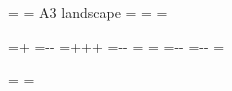 %
\ifdefined\EndleafPaper\else{}\fi
\def\EndleafPageAthree{A3}
\def\EndleafPageLandscape{landscape}
\newif\ifEndleafPageResize
\newdimen\EndleafPageW
\newdimen\EndleafPageH
\newdimen\EndleafPageL
\newdimen\EndleafPageR
\newdimen\EndleafPageT
\newdimen\EndleafPageB
\EndleafPageW=\paperwidth
\EndleafPageH=\paperheight
\ifx\EndleafPaper\EndleafPageAthree
  \EndleafPageW=297mm
  \EndleafPageH=420mm
  \EndleafPageResizetrue
\fi
\ifdefined\EndleafOrientation
  \ifx\EndleafOrientation\EndleafPageLandscape
    \EndleafPageL=\EndleafPageW
    \EndleafPageW=\EndleafPageH
    \EndleafPageH=\EndleafPageL
    \EndleafPageResizetrue
  \fi
\fi
\ifEndleafPageResize
  \EndleafPageL=\dimexpr 1in+\oddsidemargin\relax
  \EndleafPageR=\dimexpr\paperwidth-\EndleafPageL-\textwidth\relax
  \EndleafPageT=\dimexpr 1in+\topmargin+\headheight+\headsep\relax
  \EndleafPageB=\dimexpr\paperheight-\EndleafPageT-\textheight\relax
  \paperwidth=\EndleafPageW
  \paperheight=\EndleafPageH
  \textwidth=\dimexpr\paperwidth-\EndleafPageL-\EndleafPageR\relax
  \textheight=\dimexpr\paperheight-\EndleafPageT-\EndleafPageB\relax
  \evensidemargin=\oddsidemargin
\fi
\ifdefined\pdfpagewidth
  \pdfpagewidth=\paperwidth
  \pdfpageheight=\paperheight
\fi
